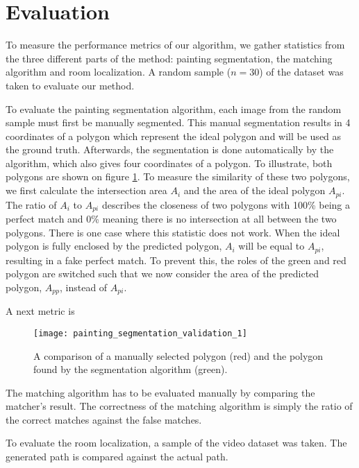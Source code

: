 \section{Evaluation}
	To measure the performance metrics of our algorithm, we gather statistics from the three different parts of the method: painting segmentation, the matching algorithm and room localization. A random sample ($n = 30$) of the dataset was taken to evaluate our method.
	
	To evaluate the painting segmentation algorithm, each image from the random sample must first be manually segmented. This manual segmentation results in 4 coordinates of a polygon which represent the ideal polygon and will be used as the ground truth. Afterwards, the segmentation is done automatically by the algorithm, which also gives four coordinates of a polygon. To illustrate, both polygons are shown on figure \ref{fig:painting_segmentation_validation_1}.
	To measure the similarity of these two polygons, we first calculate the intersection area $A_i$ and the area of the ideal polygon $A_{pi}$. The ratio of $A_i$ to $A_{pi}$ describes the closeness of two polygons with 100\% being a perfect match and 0\% meaning there is no intersection at all between the two polygons. There is one case where this statistic does not work. When the ideal polygon is fully enclosed by the predicted polygon, $A_i$ will be equal to $A_{pi}$, resulting in a fake perfect match. To prevent this, the roles of the green and red polygon are switched such that we now consider the area of the predicted polygon, $A_{pp}$, instead of $A_{pi}$.
	
	A next metric is 
	

	
	\begin{figure}
		\centering
		\texttt{[image: painting\_segmentation\_validation\_1]}
		\caption{A comparison of a manually selected polygon (red) and the polygon found by the segmentation algorithm (green).}
		\label{fig:painting_segmentation_validation_1}
	\end{figure}


	
	The matching algorithm has to be evaluated manually by comparing the matcher's result. The correctness of the matching algorithm is simply the ratio of the correct matches against the false matches.
	
	To evaluate the room localization, a sample of the video dataset was taken. The generated path is compared against the actual path.